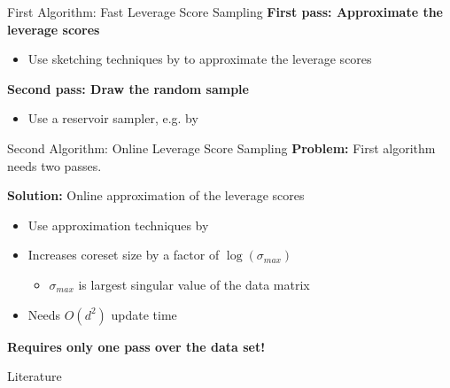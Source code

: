 \documentclass[gray]{beamer}
\begin{document}
\begin{frame}{First Algorithm: Fast Leverage Score Sampling}
    \textbf{First pass: Approximate the leverage scores}
    \begin{itemize}
        \item Use sketching techniques by \cite{woodruff-2017} to
              approximate the leverage scores
    \end{itemize}

    \vspace{\fill}

    \textbf{Second pass: Draw the random sample}
    \begin{itemize}
        \item Use a reservoir sampler, e.g. by \cite{reservoir-sampler}
    \end{itemize}

    \vspace{\fill}

    \centering
\end{frame}

\begin{frame}{Second Algorithm: Online Leverage Score Sampling}
    \textbf{Problem:} First algorithm needs two passes.

    \vspace{\fill}

    \textbf{Solution:} Online approximation of the leverage scores
    \begin{itemize}
        \item Use approximation techniques by \cite{tensor-factorization}
        \item Increases coreset size by a factor of $\log(\sigma_{max})$
              \begin{itemize}
                  \item $\sigma_{max}$ is largest singular value of the data matrix
              \end{itemize}
        \item Needs $O(d^2)$ update time
    \end{itemize}

    \vspace{\fill}

    \textbf{Requires only one pass over the data set!}
\end{frame}


\begin{frame}{Literature}
    \nocite{*}
    
    
\end{frame}
\end{document}
